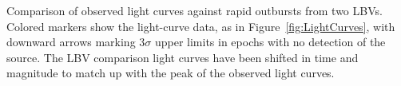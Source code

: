 Comparison of observed \spock light curves against rapid outbursts
from two LBVs. Colored markers show the \spock light-curve data, as in
Figure~\ref{fig:LightCurves}, with downward arrows marking 3$\sigma$
upper limits in epochs with no detection of the \spock source. The LBV
comparison light curves have been shifted in time and magnitude to
match up with the peak of the observed light curves.
\label{fig:LBVLightCurveComparison}
